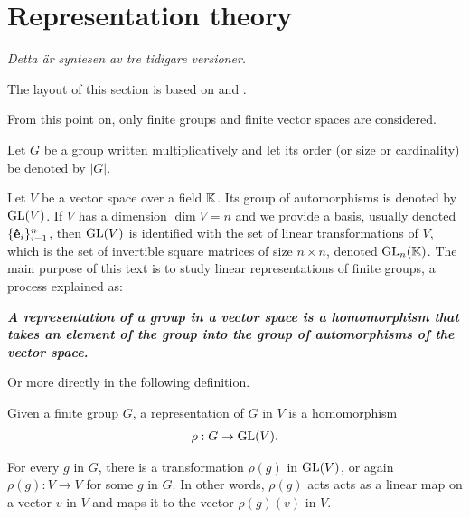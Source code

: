 \clearpage{\thispagestyle{empty}}
\section{Representation theory}

	\textit{Detta är syntesen av tre tidigare versioner. }
	
	The layout of this section is based on \cite{Serre} and \cite{FultonHarris}.
	
	From this point on, only finite groups and finite vector spaces are considered. 

	Let $G$ be a group written multiplicatively and let its order (or size or cardinality) be denoted by $|G|$.
	
	Let $V$ be a vector space over a field $\mathbb{K}$. Its group of automorphisms is denoted by $\text{GL}(V)$. If $V$ has a dimension $\dim V = n$ and we provide a basis, usually denoted $\{\mathbf{\hat{e}}_i\}_{i=1}^n$, then $\text{GL}(V)$ is identified with the set of linear transformations of $V$, which is the set of invertible square matrices of size $n \times n$, denoted $\text{GL}_n(\mathbb{K})$\cite[18.1]{DummitFoote}. The main purpose of this text is to study linear representations of finite groups, a process explained as:
	
	\textbf{\emph{A representation of a group in a vector space is a homomorphism that takes an element of the group into the group of automorphisms of the vector space.}}
	
	Or more directly in the following definition.
	
	\begin{definition}[Representation]
		Given a finite group $G$, a representation of $G$ in $V$ is a homomorphism
		\begin{align}
			\rho: G \rightarrow \text{GL}(V).
		\end{align}
	\end{definition}
	For every $g$ in $G$, there is a transformation $\rho(g)$ in $\text{GL}(V)$, or again $\rho(g): V \rightarrow V$ for some $g$ in $G$. In other words, $\rho(g)$ acts acts as a linear map on a vector $v$ in $V$ and maps it to the vector $\rho(g)(v)$ in $V$.
	
